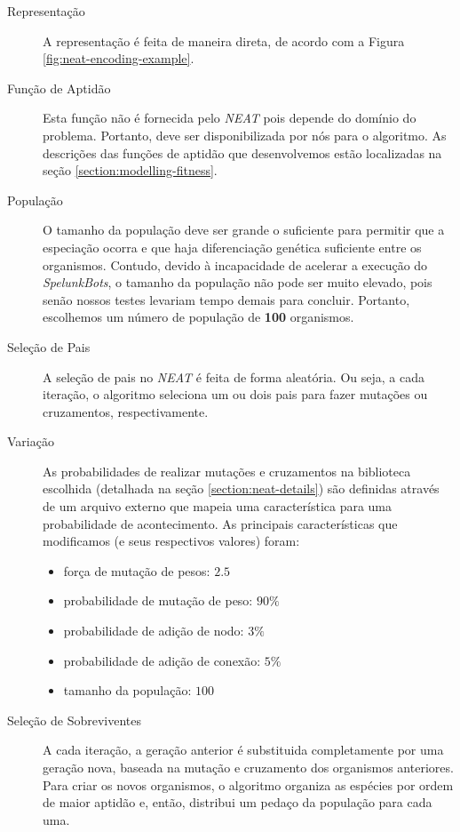 \begin{description}
	\item[Representação]
		A representação é feita de maneira direta, de acordo com a Figura
		\ref{fig:neat-encoding-example}.

	\item[Função de Aptidão]
		Esta função não é fornecida pelo \textit{NEAT} pois depende do domínio
		do problema. Portanto, deve ser disponibilizada por nós para o
		algoritmo. As descrições das funções de aptidão que desenvolvemos estão
		localizadas na seção \ref{section:modelling-fitness}.

	\item[População]
		O tamanho da população deve ser grande o suficiente para permitir que a
		especiação ocorra e que haja diferenciação genética suficiente entre os
		organismos. Contudo, devido à incapacidade de acelerar a execução do
		\textit{SpelunkBots}, o tamanho da população não pode ser muito elevado,
		pois senão nossos testes levariam tempo demais para concluir. Portanto,
		escolhemos um número de população de \textbf{100} organismos.

	\item[Seleção de Pais] A seleção de pais no \textit{NEAT} é feita de forma
		aleatória. Ou seja, a cada iteração, o algoritmo seleciona um ou dois
		pais para fazer mutações ou cruzamentos, respectivamente.

	\item[Variação] As probabilidades de realizar mutações e cruzamentos na
		biblioteca escolhida (detalhada na seção \ref{section:neat-details}) são
		definidas através de um arquivo externo que mapeia uma característica
		para uma probabilidade de acontecimento. As principais características
		que modificamos (e seus respectivos valores) foram:
		\begin{itemize}
				\item força de mutação de pesos: $2.5$
				\item probabilidade de mutação de peso: $90\%$
				\item probabilidade de adição de nodo: $3\%$
				\item probabilidade de adição de conexão: $5\%$
				\item tamanho da população: $100$
		\end{itemize}

	\item[Seleção de Sobreviventes]
		A cada iteração, a geração anterior é substituida completamente por uma
		geração nova, baseada na mutação e cruzamento dos organismos anteriores.
		Para criar os novos organismos, o algoritmo organiza as espécies por
		ordem de maior aptidão e, então, distribui um pedaço da população para
		cada uma.

\end{description}

